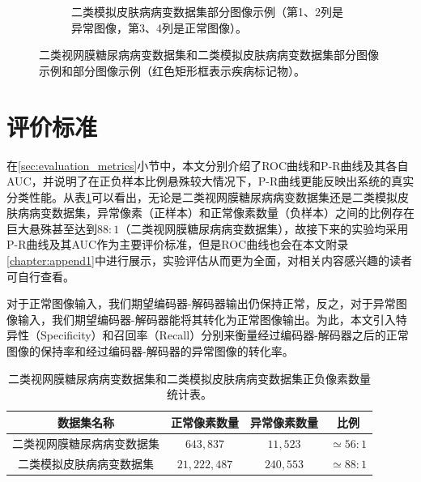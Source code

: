 \begin{figure}[h]
\begin{subfigure}{0.48\textwidth}
		\caption{二类模拟皮肤病病变数据集部分图像示例（第1、2列是异常图像，第3、4列是正常图像）。}
		\label{subfig:bin_simulate_skin_example}
	\end{subfigure}
	\caption[本文实验数据集部分图像示例]{二类视网膜糖尿病病变数据集和二类模拟皮肤病病变数据集部分图像示例和部分图像示例（红色矩形框表示疾病标记物）。}
	\label{mul_fig:bin_ds_example}
\end{figure}
\section{评价标准}\label{sec:exper_evaluation_metrics}

在\ref{sec:evaluation_metrics}小节中，本文分别介绍了ROC曲线和P-R曲线及其各自AUC，并说明了在正负样本比例悬殊较大情况下，P-R曲线更能反映出系统的真实分类性能。从表\ref{tab:bin_ds_pixel_freqs}可以看出，无论是二类视网膜糖尿病病变数据集还是二类模拟皮肤病病变数据集，异常像素（正样本）和正常像素数量（负样本）之间的比例存在巨大悬殊甚至达到$88:1$（二类视网膜糖尿病病变数据集），故接下来的实验均采用P-R曲线及其AUC作为主要评价标准，但是ROC曲线也会在本文附录\ref{chapter:append1}中进行展示，实验评估从而更为全面，对相关内容感兴趣的读者可自行查看。

对于正常图像输入，我们期望编码器-解码器输出仍保持正常，反之，对于异常图像输入，我们期望编码器-解码器能将其转化为正常图像输出。为此，本文引入特异性（Specificity）和召回率（Recall）分别来衡量经过编码器-解码器之后的正常图像的保持率和经过编码器-解码器的异常图像的转化率。

\begin{table}[h]
	\centering
	\caption[本文实验数据集正负像素数量统计表]{二类视网膜糖尿病病变数据集和二类模拟皮肤病病变数据集正负像素数量统计表。}
	\label{tab:bin_ds_pixel_freqs}
	\begin{tabular}{c|c|c|c}
		\toprule[2pt]
		数据集名称 & 正常像素数量 & 异常像素数量 & 比例 \\
		\midrule[2pt]
		二类视网膜糖尿病病变数据集&  $643,837$ & $11,523$ & $\simeq 56: 1$ \\ \hline
		二类模拟皮肤病病变数据集 & $21,222,487$ & $240,553$ & $\simeq 88: 1$ \\
		\bottomrule[2pt]
	\end{tabular}
\end{table}


